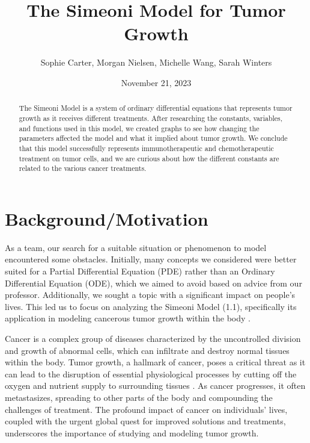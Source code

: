 \documentclass[11pt,reqno]{amsart}
\begin{document}
\title{The Simeoni Model for Tumor Growth}
\author{Sophie Carter, Morgan Nielsen, Michelle Wang, Sarah Winters}
\date{November 21, 2023}



\maketitle

\begin{abstract}
The Simeoni Model is a system of ordinary differential equations that represents tumor growth as it receives different treatments. After researching the constants, variables, and functions used in this model, we created graphs to see how changing the parameters affected the model and what it implied about tumor growth. We conclude that this model successfully represents immunotherapeutic and chemotherapeutic treatment on tumor cells, and we are curious about how the different constants are related to the various cancer treatments. 
\end{abstract}

\section{Background/Motivation}
As a team, our search for a suitable situation or phenomenon to model encountered some obstacles. Initially, many concepts we considered were better suited for a Partial Differential Equation (PDE) rather than an Ordinary Differential Equation (ODE), which we aimed to avoid based on advice from our professor. Additionally, we sought a topic with a significant impact on people's lives. This led us to focus on analyzing the Simeoni Model (1.1), specifically its application in modeling cancerous tumor growth within the body \cite{Koziol_Falls_Schnitzer_2020}.

Cancer is a complex group of diseases characterized by the uncontrolled division and growth of abnormal cells, which can infiltrate and destroy normal tissues within the body. Tumor growth, a hallmark of cancer, poses a critical threat as it can lead to the disruption of essential physiological processes by cutting off the oxygen and nutrient supply to surrounding tissues \cite{Cancer_Research_2023}. As cancer progresses, it often metastasizes, spreading to other parts of the body and compounding the challenges of treatment. The profound impact of cancer on individuals' lives, coupled with the urgent global quest for improved solutions and treatments, underscores the importance of studying and modeling tumor growth.
\end{document}
